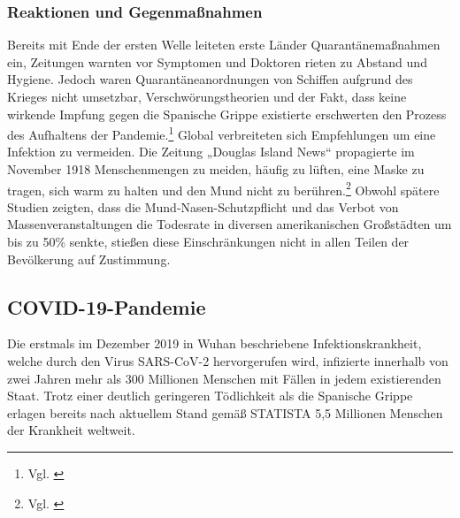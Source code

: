 \documentclass[12pt]{article}
\begin{document}
\subsubsection{Reaktionen und Gegenmaßnahmen}
Bereits mit Ende der ersten Welle leiteten erste Länder Quarantänemaßnahmen ein, Zeitungen warnten vor Symptomen und Doktoren rieten zu Abstand und Hygiene. Jedoch waren Quarantäneanordnungen von Schiffen aufgrund des Krieges nicht umsetzbar, Verschwörungstheorien und der Fakt, dass keine wirkende Impfung gegen die Spanische Grippe existierte erschwerten den Prozess des Aufhaltens der Pandemie.\footnote{Vgl. \cite{Hist10}} Global verbreiteten sich Empfehlungen um eine Infektion zu vermeiden. Die Zeitung „Douglas Island News“ propagierte im November 1918 Menschenmengen zu meiden, häufig zu lüften, eine Maske zu tragen, sich warm zu halten und den Mund nicht zu berühren.\footnote{Vgl. \cite{Mai2021}} Obwohl spätere Studien zeigten, dass die Mund-Nasen-Schutzpflicht und das Verbot von Massenveranstaltungen die Todesrate in diversen amerikanischen Großstädten um bis zu 50\% senkte, stießen diese Einschränkungen nicht in allen Teilen der Bevölkerung auf Zustimmung.

\subsection{COVID-19-Pandemie}
Die erstmals im Dezember 2019 in Wuhan beschriebene Infektionskrankheit, welche durch den Virus SARS-CoV-2 hervorgerufen wird, infizierte innerhalb von zwei Jahren mehr als 300 Millionen Menschen mit Fällen in jedem existierenden Staat. Trotz einer deutlich geringeren Tödlichkeit als die Spanische Grippe erlagen bereits nach aktuellem Stand gemäß STATISTA 5,5 Millionen Menschen der Krankheit weltweit.
\end{document}

